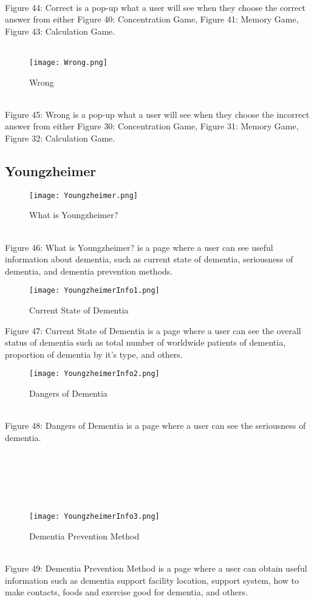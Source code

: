 \documentclass[conference]{IEEEtran}
\begin{document}
\\
Figure 44: Correct is a pop-up what a user will see when they choose the correct answer from either Figure 40: Concentration Game, Figure 41: Memory Game, Figure 43: Calculation Game.
\\\\
\begin{figure}[h]
\centerline{\texttt{[image: Wrong.png]}}
\caption{Wrong}
\label{fig}
\end{figure}
\\
Figure 45: Wrong is a pop-up what a user will see when they choose the incorrect answer from either Figure 30: Concentration Game, Figure 31: Memory Game, Figure 32: Calculation Game.
\subsection{Youngzheimer}
\begin{figure}[h]
\centerline{\texttt{[image: Youngzheimer.png]}}
\caption{What is Youngzheimer?}
\label{fig}
\end{figure}
\\
Figure 46: What is Youngzheimer? is a page where a user can see useful information about dementia, such as current state of dementia, seriousness of dementia, and dementia prevention methods.

\clearpage
\begin{figure}[h]
\centerline{\texttt{[image: YoungzheimerInfo1.png]}}
\caption{Current State of Dementia}
\label{fig}
\end{figure}
Figure 47: Current State of Dementia is a page where a user can see the overall status of dementia such as total number of worldwide patients of dementia, proportion of dementia by it's type, and others.
\\
\begin{figure}[h]
\centerline{\texttt{[image: YoungzheimerInfo2.png]}}
\caption{Dangers of Dementia}
\label{fig}
\end{figure}
\\
Figure 48: Dangers of Dementia is a page where a user can see the seriousness of dementia.
\\\\\\\\\\\\
\begin{figure}[h]
\centerline{\texttt{[image: YoungzheimerInfo3.png]}}
\caption{Dementia Prevention Method}
\label{fig}
\end{figure}
\\
Figure 49: Dementia Prevention Method is a page where a user can obtain useful information such as dementia support facility location, support system, how to make contacts, foods and exercise good for dementia, and others.
\end{document}
